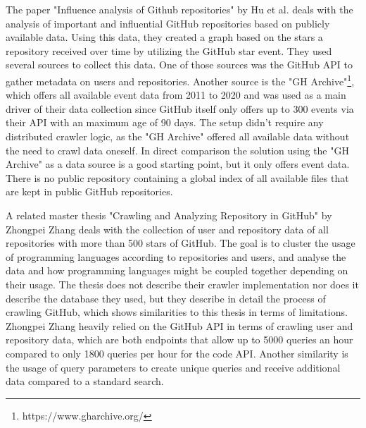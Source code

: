 The paper "Influence analysis of Github repositories" by Hu et al. deals with the analysis of important and influential GitHub repositories based on publicly available data. Using this data, they created a graph based on the stars a repository received over time by utilizing the GitHub star event. They used several sources to collect this data. One of those sources was the GitHub API to gather metadata on users and repositories. Another source is the "GH Archive"\footnote{https://www.gharchive.org/}, which offers all available event data from 2011 to 2020 and was used as a main driver of their data collection since GitHub itself only offers up to 300 events via their API with an maximum age of 90 days. The setup didn't require any distributed crawler logic, as the "GH Archive" offered all available data without the need to crawl data oneself. In direct comparison the solution using the "GH Archive" as a data source is a good starting point, but it only offers event data. There is no public repository containing a global index of all available files that are kept in public GitHub repositories.

A related master thesis "Crawling and Analyzing Repository in GitHub" by Zhongpei Zhang deals with the collection of user and repository data of all repositories with more than 500 stars of GitHub. The goal is to cluster the usage of programming languages according to repositories and users, and analyse the data and how programming languages might be coupled together depending on their usage. The thesis does not describe their crawler implementation nor does it describe the database they used, but they describe in detail the process of crawling GitHub, which shows similarities to this thesis in terms of limitations. Zhongpei Zhang heavily relied on the GitHub API in terms of crawling user and repository data, which are both endpoints that allow up to 5000 queries an hour compared to only 1800 queries per hour for the code API. Another similarity is the usage of query parameters to create unique queries and receive additional data compared to a standard search.

